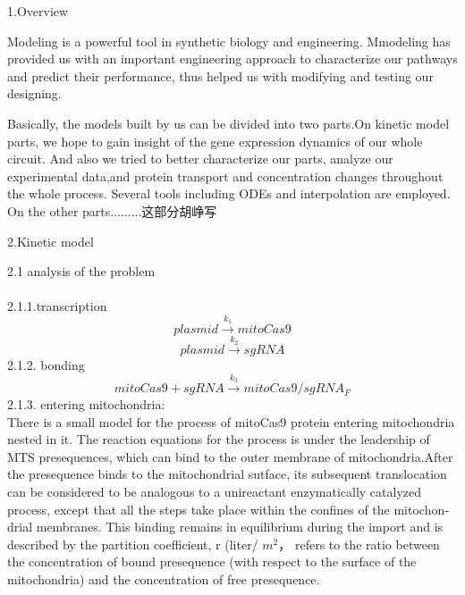 \documentclass[UTF8]{ctexart}
\begin{document}
	\begin{center}
		{\Large 1.Overview} 
	\end{center}
   Modeling is a powerful tool in synthetic biology and engineering. Mmodeling has provided us with an important engineering approach to characterize our pathways and predict their performance, thus helped us with modifying and testing our designing.
	
	Basically, the models built by us can be divided into two parts.On kinetic model parts, we hope to gain insight of the gene expression dynamics of our whole circuit. And also we tried to better characterize our parts, analyze our experimental data,and protein transport and concentration changes throughout the whole process. Several tools including ODEs and interpolation are employed.
	On the other parts.........这部分胡峥写
	\begin{center}
	{\Large 2.Kinetic model} 
    \end{center}
  {\Large 2.1 analysis of the problem} 
\\\\
2.1.1.transcription
	\begin{displaymath}
	plasmid \stackrel{k_1}{\longrightarrow} mitoCas9 
	\end{displaymath}
	\begin{displaymath}
	plasmid\stackrel{k_2}{\longrightarrow}sgRNA
	\end{displaymath}
	2.1.2. bonding
	\begin{displaymath}
	mitoCas9+sgRNA\stackrel{k_3}{\longrightarrow}mitoCas9/sgRNA_F
	\end{displaymath}
	2.1.3. entering mitochondria:\\
There is a small model for the process of mitoCas9 protein entering mitochondria nested in it.
The reaction equations for the process is under the leadership of MTS presequences, which can bind to the outer membrane of mitochondria.After the presequence binds to the mitochondrial sutface, its
subsequent translocation can be considered to be analogous to a unireactant enzymatically catalyzed process, except that all the steps take place within the confines of the mitochon­ drial membranes. This binding remains in equilibrium dur­ing the import and is described by  the partition  coefficient,  r (liter/ 
$m^2$， refers  to the  ratio
between the concentration of bound presequence (with re­spect to the surface of the mitochondria) and the concentra­tion of free presequence. 
\end{document}
